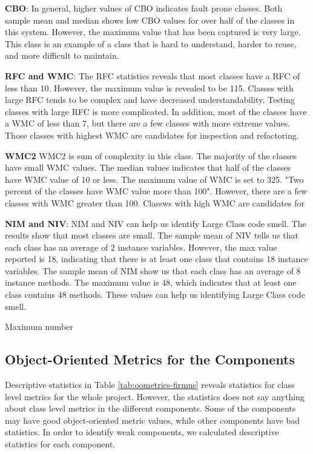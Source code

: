 \textbf{CBO}: In general, higher values of CBO indicates fault prone classes. Both sample mean and median shows low CBO values for over half of the classes in this system. However, the maximum value that has been captured is very large. This class is an example of a class that is hard to understand, harder to reuse, and more difficult to maintain. 

\textbf{RFC and WMC}: The RFC statistics reveals that most classes have a RFC of less than 10. However, the maximum value is revealed to be 115. Classes with large RFC tends to be complex and have decreased understandability. Testing classes with large RFC is more complicated. In addition, most of the classes have a WMC of less than 7, but there are a few classes with more extreme values. Those classes with highest WMC are candidates for inspection and refactoring. 

\textbf{WMC2} WMC2 is sum of complexity in this class. The majority of the classes have small WMC values. The median values indicates that half of the classes have WMC value of 10 or less. The maximum value of WMC is set to 325. "Two percent of the classes have WMC value more than 100". However, there are a few classes with WMC greater than 100. Classws with high WMC are candidates for 

\textbf{NIM and NIV}: NIM and NIV can help us identify Large Class code smell. The results show that most classes are small. The sample mean of NIV tells us that each class has an average of 2 instance variables. However, the max value reported is 18, indicating that there is at least one class that contains 18 instance variables. The sample mean of NIM show us that each class has an average of 8 instance methods. The maximum value is 48, which indicates that at least one class contains 48 methods. These values can help us identifying Large Class code smell.

Maximum number



\subsection{Object-Oriented Metrics for the Components}
Descriptive statistics in Table \ref{tab:oometrics-firmus} reveals statistics for class level metrics for the whole project. However, the statistics does not say anything about class level metrics in the different components. Some of the components may have good object-oriented metric values, while other components have bad statistics. In order to identify weak components, we calculated descriptive statistics for each component. 


